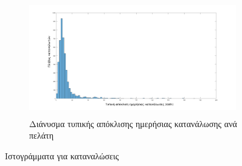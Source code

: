 \begin{figure}[ht!]
\begin{subfigure}[b]{0.4\textwidth}
 	\includegraphics[width=90mm, height=50mm]{../../plots/Consumption_Analysis/gr_hist_std_year.png}
	\caption{Διάνυσμα τυπικής απόκλισης ημερήσιας κατανάλωσης ανά πελάτη}
	\label{fig:histstdyear}
	\end{subfigure}
	\caption{Ιστογράμματα για καταναλώσεις}
	\label{fig:histograms}
\end{figure}

